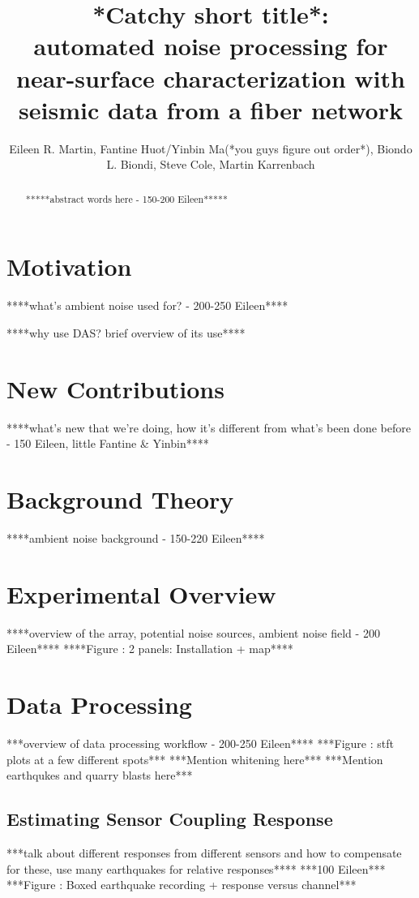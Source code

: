 \documentclass[11pt]{amsart}
\title{*Catchy short title*: \\
automated noise processing for near-surface characterization with seismic data from a fiber network}
\author{Eileen R. Martin, Fantine Huot/Yinbin Ma(*you guys figure out order*), Biondo L. Biondi, Steve Cole, Martin Karrenbach}
\begin{document}
\maketitle

\begin{abstract} 
*****abstract words here - 150-200 Eileen*****
\end{abstract}


\section*{Motivation}
****what's ambient noise used for? - 200-250 Eileen****

****why use DAS? brief overview of its use****



\section*{New Contributions}
****what's new that we're doing, how it's different from what's been done before - 150 Eileen, little Fantine & Yinbin****



\section*{Background Theory}
****ambient noise background - 150-220 Eileen****



\section*{Experimental Overview}
****overview of the array, potential noise sources, ambient noise field - 200 Eileen****
****Figure : 2 panels: Installation + map****



\section*{Data Processing}
***overview of data processing workflow - 200-250 Eileen****
***Figure : stft plots at a few different spots***
***Mention whitening here***
***Mention earthqukes and quarry blasts here***

\subsection*{Estimating Sensor Coupling Response}
***talk about different responses from different sensors and how to compensate for these, use many earthquakes for relative responses****
***100 Eileen***
***Figure : Boxed earthquake recording + response versus channel***
\end{document}
